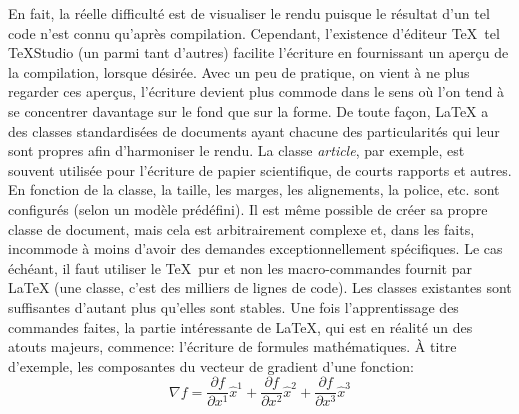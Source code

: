 	En fait, la réelle difficulté est de visualiser le rendu puisque le résultat d'un tel code n'est connu qu'après compilation. Cependant, l'existence d'éditeur \TeX~tel TeXStudio (un parmi tant d'autres) facilite l'écriture en fournissant un aperçu de la compilation, lorsque désirée. Avec un peu de pratique, on vient à ne plus regarder ces aperçus, l'écriture devient plus commode dans le sens où l'on tend à se concentrer davantage sur le fond que sur la forme. De toute façon, \LaTeX{} a des classes standardisées de documents ayant chacune des particularités qui leur sont propres afin d'harmoniser le rendu. La classe \textit{article}, par exemple, est souvent utilisée pour l'écriture de papier scientifique, de courts rapports et autres. En fonction de la classe, la taille, les marges, les alignements, la police, etc. sont configurés (selon un modèle prédéfini). Il est même possible de créer sa propre classe de document, mais cela est arbitrairement complexe et, dans les faits, incommode à moins d'avoir des demandes exceptionnellement spécifiques. Le cas échéant, il faut utiliser le \TeX~pur et non les macro-commandes fournit par \LaTeX{} (une classe, c'est des milliers de lignes de code). Les classes existantes sont suffisantes d'autant plus qu'elles sont stables. 
	Une fois l'apprentissage des commandes faites, la partie intéressante de \LaTeX, qui est en réalité un des atouts majeurs, commence: l'écriture de formules mathématiques. À titre d'exemple, les composantes du vecteur de gradient d'une fonction:
	\begin{equation}\label{eq:exemple}
	\nabla f =%
	\frac{\partial f}{\partial x^1}\widehat{x}^1%
	+\frac{\partial f}{\partial x^2}\widehat{x}^2%
	+\frac{\partial f}{\partial x^3}\widehat{x}^3
	\end{equation}
